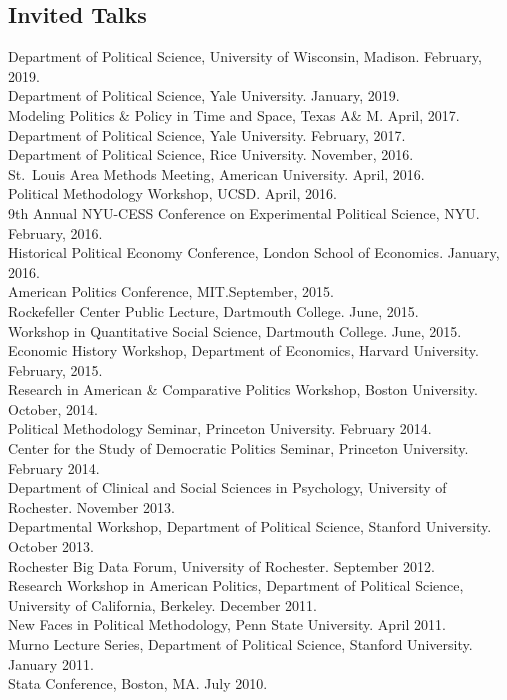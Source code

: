 \documentclass[margin,line,12pt]{res}
\begin{document}
\begin{resume}
\section{\textsf{\sc Invited Talks}}

Department of Political Science,  University of Wisconsin, Madison. February, 2019. \\
Department of Political Science, Yale University. January, 2019. \\
Modeling Politics \& Policy in Time and Space, Texas A\& M. April, 2017. \\
Department of Political Science, Yale University. February, 2017. \\
Department of Political Science, Rice University. November, 2016. \\
St.\ Louis Area Methods Meeting, American University. April, 2016. \\
Political Methodology Workshop, UCSD. April, 2016. \\
9th Annual NYU-CESS Conference on Experimental Political Science, NYU. February, 2016. \\
Historical Political Economy Conference, London School of Economics. January, 2016. \\
American Politics Conference, MIT.\@ September, 2015. \\
Rockefeller Center Public Lecture, Dartmouth College. June, 2015.\\
Workshop in Quantitative Social Science, Dartmouth College. June, 2015.\\
Economic History Workshop, Department of Economics, Harvard University. February, 2015.\\
Research in American \& Comparative Politics Workshop, Boston University. October, 2014.\\
Political Methodology Seminar, Princeton University. February 2014. \\
Center for the Study of Democratic Politics Seminar, Princeton University. February 2014.\\
Department of Clinical and Social Sciences in Psychology, University of Rochester. November 2013.\\
Departmental Workshop, Department of Political Science, Stanford University. October 2013.\\
Rochester Big Data Forum, University of Rochester. September 2012.\\
Research Workshop in American Politics, Department of Political Science, University of California, Berkeley. December 2011.\\
New Faces in Political Methodology, Penn State University. April 2011. \\
Murno Lecture Series, Department of Political Science, Stanford University. January 2011. \\
Stata Conference, Boston, MA\@. July 2010.


\end{resume}
\end{document}
